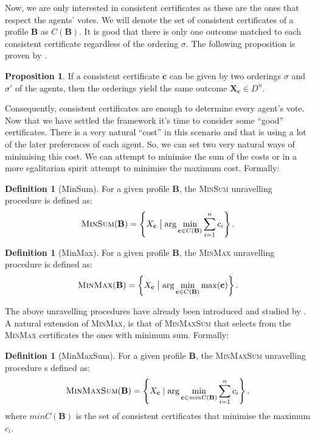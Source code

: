 \documentclass[11pt,a4paper, titlepage]{article}
\theoremstyle{definition}
\newtheorem{definition}[theorem]{Definition}
\newtheorem{proposition}[theorem]{Proposition}
\let\vec\mathbf
\begin{document}
Now, we are only interested in consistent certificates as these are the ones that respect the agents' votes. We will denote the set of consistent certificates of a profile $\mathbf{B}$ as $C(\mathbf{B})$.
It is good that there is only one outcome matched to each consistent certificate regardless of the ordering $\sigma$. The following proposition is proven by \cite{grandi}.

\begin{proposition}
    If a consistent certificate $\mathbf{c}$ can be given by two orderings $\sigma$ and $\sigma'$ of the agents, then the orderings yield the same outcome $\vec{X}_\mathbf{c} \in D^n$.
\end{proposition}

Consequently, consistent certificates are enough to determine every agent's vote. 
Now that we have settled the framework it's time to consider some ``good'' certificates. 
There is a very natural ``cost'' in this scenario and that is using a lot of the later preferences of each agent. 
So, we can set two very natural ways of minimising this cost. 
We can attempt to minimise the sum of the costs or in a more egalitarian spirit attempt to minimise the maximum cost. 
Formally:

\begin{definition}[MinSum]
    For a given profile $\mathbf{B}$, the \textsc{MinSum} unravelling procedure is defined as:
    \[
        \textsc{MinSum}(\mathbf{B}) = 
        \left\{X_{\mathbf{c}} \bigm| \mathrm{arg} \min_{\mathbf{c} \in C(\mathbf{B})} \sum_{i=1}^n c_i\right\}.
    \]
\end{definition}

\begin{definition}[MinMax]
    For a given profile $\mathbf{B}$, the \textsc{MinMax} unravelling procedure is defined as:
    \[
        \textsc{MinMax}(\mathbf{B}) = \left\{X_{\mathbf{c}} \bigm| \mathrm{arg} \min_{\mathbf{c} \in C(\mathbf{B})} \max (\mathbf{c}) \right\}.
    \]
\end{definition}

The above unravelling procedures have already been introduced and studied by  \cite{grandi}. 
A natural extension of \textsc{MinMax}, is that of \textsc{MinMaxSum} that selects from the \textsc{MinMax} certificates the ones with minimum sum. 
Formally:

\begin{definition}[MinMaxSum]
    For a given profile $\mathbf{B}$, the \textsc{MinMaxSum} unravelling procedure s defined as:
    \[
        \textsc{MinMaxSum}(\mathbf{B}) =  \left\{ X_{\mathbf{c}}\mid \arg  \min_{\vec{c} \in \mathit{minC}(\mathbf{B})} \sum_{i=1}^n c_i \right\}.
    \]
    where $\mathit{minC}(\vec{B})$ is the set of consistent certificates that minimise the maximum $c_i$. 
\end{definition}
\end{document}
